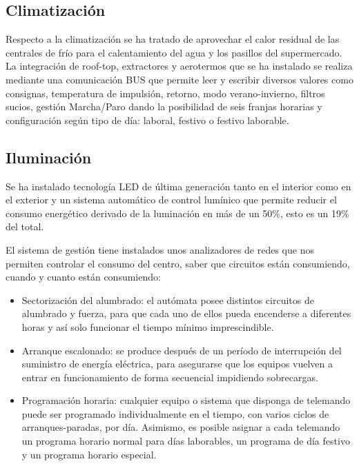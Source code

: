 \begin{multicols}{2}
\subsection{Climatización}
Respecto a la climatización se ha tratado de aprovechar el calor residual de las centrales de frío para el calentamiento del agua y los pasillos del supermercado. La integración de roof-top, extractores y aerotermos que se ha instalado se realiza mediante una comunicación BUS que permite leer y escribir diversos valores como consignas, temperatura de impulsión, retorno, modo verano-invierno, filtros sucios, gestión Marcha/Paro dando la posibilidad de seis franjas horarias y configuración según tipo de día: laboral, festivo o festivo laborable. 
\subsection{Iluminación}
Se ha instalado tecnología LED de última generación tanto en el interior como en el exterior y un sistema automático de control lumínico que permite reducir el consumo energético derivado de la luminación en más de un 50\%, esto es un 19\% del total.

El sistema de gestión tiene instalados unos analizadores de redes que nos permiten controlar el consumo del centro, saber que
circuitos están consumiendo, cuando y cuanto están consumiendo:
\begin{itemize}
\item Sectorización del alumbrado: el autómata posee distintos circuitos de alumbrado y fuerza, para que cada uno de ellos
pueda encenderse a diferentes horas y así solo funcionar el tiempo mínimo imprescindible.

\item Arranque escalonado: se produce después de un período de interrupción del suministro de energía eléctrica, para
asegurarse que los equipos vuelven a entrar en funcionamiento de forma secuencial impidiendo sobrecargas.

\item Programación horaria: cualquier equipo o sistema que disponga de telemando puede ser programado individualmente
en el tiempo, con varios ciclos de arranques-paradas, por día. Asimismo, es posible asignar a cada telemando un programa
horario normal para días laborables, un programa de día festivo y un programa horario especial.


\end{itemize}
\end{multicols}
